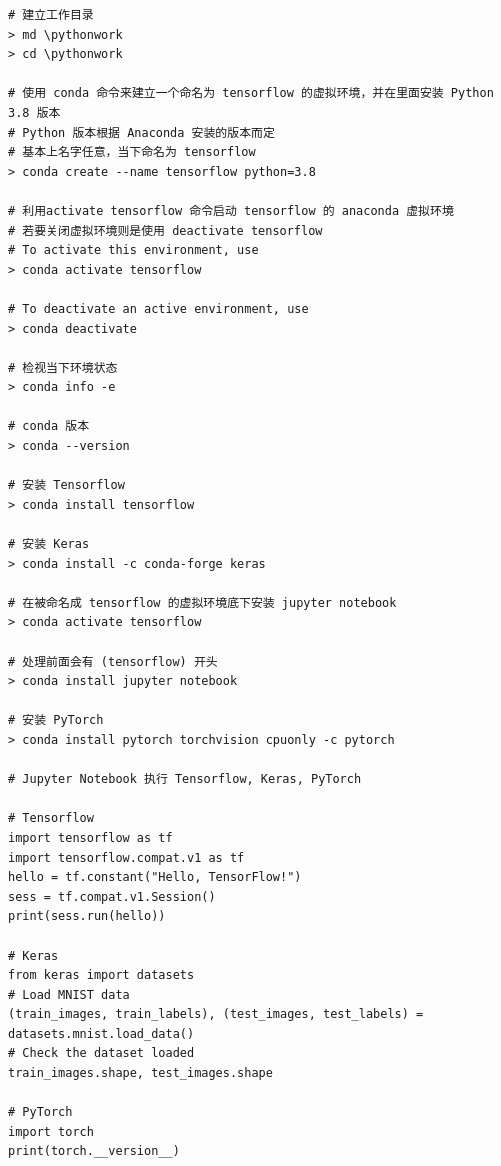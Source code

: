 \begin{Verbatim}
# 建立工作目录
> md \pythonwork
> cd \pythonwork

# 使用 conda 命令来建立一个命名为 tensorflow 的虚拟环境，并在里面安装 Python 3.8 版本
# Python 版本根据 Anaconda 安装的版本而定
# 基本上名字任意，当下命名为 tensorflow
> conda create --name tensorflow python=3.8

# 利用activate tensorflow 命令启动 tensorflow 的 anaconda 虚拟环境
# 若要关闭虚拟环境则是使用 deactivate tensorflow
# To activate this environment, use
> conda activate tensorflow

# To deactivate an active environment, use
> conda deactivate

# 检视当下环境状态
> conda info -e

# conda 版本
> conda --version

# 安装 Tensorflow
> conda install tensorflow

# 安装 Keras
> conda install -c conda-forge keras

# 在被命名成 tensorflow 的虚拟环境底下安装 jupyter notebook
> conda activate tensorflow

# 处理前面会有 (tensorflow) 开头
> conda install jupyter notebook

# 安装 PyTorch
> conda install pytorch torchvision cpuonly -c pytorch

# Jupyter Notebook 执行 Tensorflow, Keras, PyTorch

# Tensorflow
import tensorflow as tf
import tensorflow.compat.v1 as tf
hello = tf.constant("Hello, TensorFlow!")
sess = tf.compat.v1.Session()
print(sess.run(hello))

# Keras
from keras import datasets
# Load MNIST data
(train_images, train_labels), (test_images, test_labels) = datasets.mnist.load_data()
# Check the dataset loaded
train_images.shape, test_images.shape

# PyTorch
import torch
print(torch.__version__)
\end{Verbatim}


